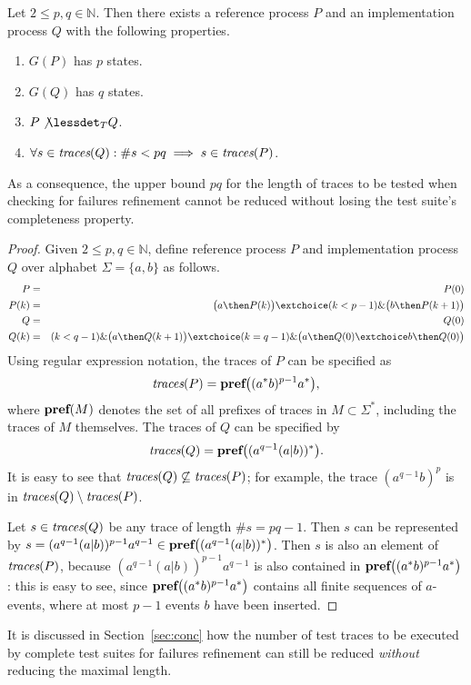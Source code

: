 \begin{theorem}
Let $2\le p,q \in\mathbb{N}$. Then there exists a reference process $P$ and an
implementation process $Q$ with the following properties.
\begin{enumerate}
\item $G(P)$ has $p$ states.
\item $G(Q)$ has $q$ states.
\item $P\not\lessdet_T Q$.
\item $\forall s\in\text{\it traces}(Q): \#s < pq\implies s\in\text{\it traces}(P)$.
\end{enumerate}
As a consequence, the upper bound $pq$ for the length of traces to be tested when checking for failures refinement cannot be reduced without losing the test suite's completeness property.
\end{theorem}
\begin{proof}
Given $2\le p,q \in\mathbb{N}$, define reference process $P$ and implementation process $Q$
over alphabet $\Sigma =\{ a,b\}$ as follows.
\begin{eqnarray*}
P & = &  P(0) 
\\
P(k) & = & \big( a \then P(k) \big) \extchoice (k < p-1) \& \big( b \then P(k+1)\big)
\\ 
Q & = & Q(0)
\\
Q(k) & = & (k < q-1) \& \big( a \then Q(k+1)    \big) \extchoice 
( k = q-1)\& \big( a\then Q(0) \extchoice b\then Q(0)  \big)
\end{eqnarray*}
Using regular expression notation, the traces of $P$ can be specified as
\[
\text{\it traces}(P) = \text{\bf pref}\big(  (a^*b)^{p-1}a^* \big),
\]
where $\text{\bf pref}(M)$ denotes the set of all prefixes of traces in $M\subset\Sigma^*$, 
including the traces of $M$ themselves.
The traces of $Q$ can be specified by
\[
\text{\it traces}(Q) = \text{\bf pref}\big( (a^{q-1}(a|b))^*  \big).
\]
It is easy to see that $\text{\it traces}(Q)\not\subseteq\text{\it traces}(P)$; 
for example, the trace $(a^{q-1}b)^p$ is in
$\text{\it traces}(Q)\setminus\text{\it traces}(P)$.

Let $s \in\text{\it traces}(Q)$ be any trace of length $\#s = pq-1$. Then $s$ can be represented 
by $s = (a^{q-1}(a|b))^{p-1}a^{q-1} \in \text{\bf pref}\big( (a^{q-1}(a|b))^*  \big)$. 
Then $s$ is also an element of $\text{\it traces}(P)$, because $(a^{q-1}(a|b))^{p-1}a^{q-1}$ 
is also contained in $\text{\bf pref}\big(  (a^*b)^{p-1}a^* \big)$: this is easy to see, since
$\text{\bf pref}\big(  (a^*b)^{p-1}a^* \big)$ contains all finite sequences of $a$-events, 
where at most $p-1$ events $b$ have been inserted.
\xbox
\end{proof}

It is discussed in Section~\ref{sec:conc} how the number of test traces to be executed 
by complete test suites for failures refinement   can still be reduced {\it without} reducing 
the maximal length.


